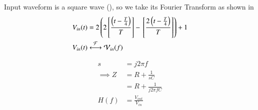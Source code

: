 \documentclass[journal,12pt,twocolumn]{IEEEtran}
\theoremstyle{remark}
\begin{document}
\solution


Input waveform is a square wave (), so we take its Fourier Transform as shown in 
\begin{align}
    V_{in}(t) &= 2\brak{2\sbrak{\frac{\brak{t-\frac{T}{4}}}{T}} - \sbrak{\frac{2\brak{t - \frac{T}{4}}}{T}}} + 1\\
    V_{in}(t) &\system{F} \mathcal{V}_{in}(f)
\end{align}

\begin{align}
    s &= j2\pi f\\
    \implies Z &= R + \frac{1}{sC}\\
    &= R + \frac{1}{j2\pi f C}\\
    H(f) &= \frac{V_{out}}{V_{in}}
\end{align}
\end{document}
